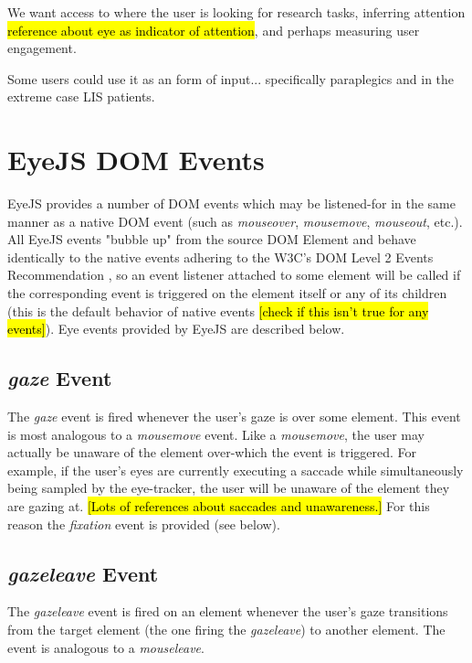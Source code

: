 \documentclass{sigchi}
\begin{document}
We want access to where the user is looking for research tasks, 
inferring attention \hl{reference about eye as indicator of attention},
and perhaps measuring user engagement.

Some users could use it as an form of input... specifically 
paraplegics and in the extreme case LIS patients.



\section{EyeJS DOM Events}
EyeJS provides a number of DOM events which may be listened-for in
the same manner as a native DOM event (such as \textit{mouseover}, 
\textit{mousemove}, \textit{mouseout}, etc.). All EyeJS events
"bubble up" from the source DOM Element and behave identically to  
the native events adhering to the W3C's DOM Level 2 Events Recommendation 
\cite{domlevel1, domlevel2},
so an event listener attached to some element will be called if the
corresponding event is triggered on the element itself or any of its
children (this is the default behavior of native events \hl{[check
if this isn't true for any events]}). Eye events provided by EyeJS
are described below.

\subsection{\textbf{\textit{gaze}} Event}
The \textit{gaze} event is fired whenever the user's gaze is over some
element. This event is most analogous to a \textit{mousemove} event.
Like a \textit{mousemove}, the user may actually be unaware of the
element over-which the event is triggered. For example, if the user's
eyes are currently executing a saccade while simultaneously being
sampled by the eye-tracker, the user will be unaware of the element they
are gazing at. \hl{[Lots of references about saccades and unawareness.]}
For this reason the \textit{fixation} event is provided (see below).

\subsection{\textbf{\textit{gazeleave}} Event}
The \textit{gazeleave} event is fired on an element whenever the 
user's gaze transitions from the target element (the one firing the
\textit{gazeleave}) to another element. The event is analogous to a \textit{mouseleave}.
\end{document}
